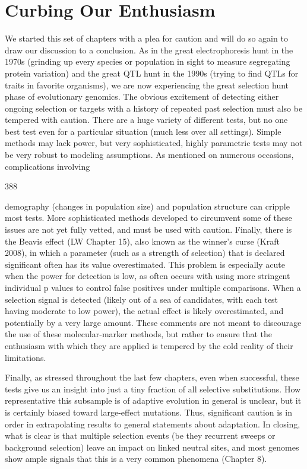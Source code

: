 \documentclass{article}
\begin{document}
\section{Curbing Our Enthusiasm}
We started this set of chapters with a plea for caution and will do so again to draw our discussion to a conclusion. As in the great electrophoresis hunt in the 1970s (grinding up every species or population in sight to measure segregating protein variation) and the great QTL hunt in the 1990s (trying to find QTLs for traits in favorite organisms), we are now experiencing the great selection hunt phase of evolutionary genomics. The obvious excitement of detecting either ongoing selection or targets with a history of repeated past selection must also be tempered with caution. There are a huge variety of different tests, but no one best test even for a particular situation (much less over all settings). Simple methods may lack power, but very sophisticated, highly parametric tests may not be very robust to modeling assumptions. As mentioned on numerous occasions, complications involving

388

demography (changes in population size) and population structure can cripple most tests. More sophisticated methods developed to circumvent some of these issues are not yet fully vetted, and must be used with caution. Finally, there is the Beavis effect (LW Chapter 15), also known as the winner's curse (Kraft 2008), in which a parameter (such as a strength of selection) that is declared significant often has its value overestimated. This problem is especially acute when the power for detection is low, as often occurs with using more stringent individual p values to control false positives under multiple comparisons. When a selection signal is detected (likely out of a sea of candidates, with each test having moderate to low power), the actual effect is likely overestimated, and potentially by a very large amount. These comments are not meant to discourage the use of these molecular-marker methods, but rather to ensure that the enthusiasm with which they are applied is tempered by the cold reality of their limitations.

Finally, as stressed throughout the last few chapters, even when successful, these tests give us an insight into just a tiny fraction of all selective substitutions. How representative this subsample is of adaptive evolution in general is unclear, but it is certainly biased toward large-effect mutations. Thus, significant caution is in order in extrapolating results to general statements about adaptation. In closing, what is clear is that multiple selection events (be they recurrent sweeps or background selection) leave an impact on linked neutral sites, and most genomes show ample signals that this is a very common phenomena (Chapter 8).
\end{document}
